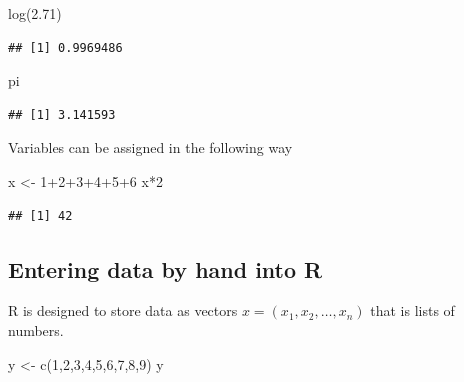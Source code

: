 \documentclass[
]{article}
\newenvironment{Shaded}{\begin{snugshade}}{\end{snugshade}}
\newcommand{\DecValTok}[1]{\textcolor[rgb]{0.00,0.00,0.81}{#1}}
\newcommand{\FloatTok}[1]{\textcolor[rgb]{0.00,0.00,0.81}{#1}}
\newcommand{\FunctionTok}[1]{\textcolor[rgb]{0.00,0.00,0.00}{#1}}
\newcommand{\NormalTok}[1]{#1}
\newcommand{\OtherTok}[1]{\textcolor[rgb]{0.56,0.35,0.01}{#1}}
\newcommand{\SpecialCharTok}[1]{\textcolor[rgb]{0.00,0.00,0.00}{#1}}
\theoremstyle{definition}
\theoremstyle{definition}
\theoremstyle{definition}
\theoremstyle{remark}
\begin{document}
\begin{Shaded}
\begin{Highlighting}[]
\FunctionTok{log}\NormalTok{(}\FloatTok{2.71}\NormalTok{)}
\end{Highlighting}
\end{Shaded}

\begin{verbatim}
## [1] 0.9969486
\end{verbatim}

\begin{Shaded}
\begin{Highlighting}[]
\NormalTok{pi}
\end{Highlighting}
\end{Shaded}

\begin{verbatim}
## [1] 3.141593
\end{verbatim}

Variables can be assigned in the following way

\begin{Shaded}
\begin{Highlighting}[]
\NormalTok{x }\OtherTok{\textless{}{-}} \DecValTok{1}\SpecialCharTok{+}\DecValTok{2}\SpecialCharTok{+}\DecValTok{3}\SpecialCharTok{+}\DecValTok{4}\SpecialCharTok{+}\DecValTok{5}\SpecialCharTok{+}\DecValTok{6}
\NormalTok{x}\SpecialCharTok{*}\DecValTok{2}
\end{Highlighting}
\end{Shaded}

\begin{verbatim}
## [1] 42
\end{verbatim}

\hypertarget{entering-data-by-hand-into-r}{%
\subsection{Entering data by hand into R}\label{entering-data-by-hand-into-r}}

R is designed to store data as vectors \(x = (x_1, x_2, \ldots, x_n)\) that is lists of numbers.

\begin{Shaded}
\begin{Highlighting}[]
\NormalTok{y }\OtherTok{\textless{}{-}} \FunctionTok{c}\NormalTok{(}\DecValTok{1}\NormalTok{,}\DecValTok{2}\NormalTok{,}\DecValTok{3}\NormalTok{,}\DecValTok{4}\NormalTok{,}\DecValTok{5}\NormalTok{,}\DecValTok{6}\NormalTok{,}\DecValTok{7}\NormalTok{,}\DecValTok{8}\NormalTok{,}\DecValTok{9}\NormalTok{)}
\NormalTok{y}
\end{Highlighting}
\end{Shaded}
\end{document}
